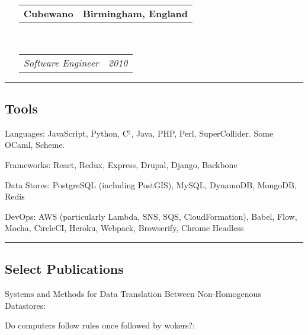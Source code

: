 \documentclass[10pt,letterpaper]{article}
\makeatletter
\newenvironment{indentsection}[1]%
{\begin{list}{}%
	{\setlength{\leftmargin}{#1}}%
	\item[]%
}
{\end{list}}
\newcommand{\headerrow}[2]
{\begin{tabular*}{\linewidth}{l@{\extracolsep{\fill}}r}
	#1 &
	#2 \\
\end{tabular*}}
\makeatother
\begin{document}
\begin{itemize}
	\item[]
	\headerrow
		{\textbf{Cubewano}}
		{\textbf{Birmingham, England}}
	\\
	\headerrow
		{\emph{Software Engineer}}
		{\emph{2010}}

\end{itemize}

\begin{center}
\hrule
\subsection*{Tools}
\end{center}

\begin{indentsection}{\parindent}
\begin{description*}
	\item[Languages:]
		JavaScript, Python, C$^\sharp$, Java, PHP, Perl, SuperCollider. Some OCaml, Scheme.
	\item[Frameworks:] React, Redux, Express, Drupal, Django, Backbone
	\item[Data Stores:] PostgreSQL (including PostGIS), MySQL, DynamoDB, MongoDB, Redis
	\item[DevOps:] AWS (particularly Lambda, SNS, SQS, CloudFormation), Babel, Flow, Mocha, CircleCI, Heroku, Webpack, Browserify, Chrome Headless
\end{description*}
\end{indentsection}

\begin{center}
\hrule
\vspace{-0.4em}
\subsection*{Select Publications}
\end{center}

\begin{indentsection}{\parindent}
\begin{description*}
	\item[Systems and Methods for Data Translation Between Non-Homogenous Datastores:]
	\item[Do computers follow rules once followed by wokers?:]
\end{description*}
\end{indentsection}
\end{document}
